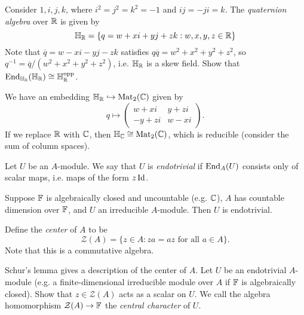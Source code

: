 \begin{exercise}
  Consider $1, i, j, k$, where
  $i^2 = j^2 = k^2 = -1$ and
  $ij = -ji = k$. The
  \emph{quaternion algebra} over $\mathbb{R}$ is
  given by
  \[
    \mathbb{H}_{\mathbb{R}}
    = \{q = w + xi + yj + zk : w, x, y, z \in \mathbb{R}\}
  \]
  Note that $\overline{q} = w - xi - yj - zk$
  satisfies
  $q \overline{q} = w^2 + x^2 + y^2 + z^2$,
  so $q^{-1} = \overline{q} / (w^2 + x^2 + y^2 + z^2)$, i.e.
  $\mathbb{H}_{\mathbb{R}}$ is a skew field.
  Show that
  $\operatorname{End}_{\mathbb{H}_{\mathbb{R}}}(\mathbb{H}_{\mathbb{R}}) \cong \mathbb{H}_{\mathbb{R}}^\mathrm{opp}$.
\end{exercise}

\begin{remark}
  We have an embedding
  $\mathbb{H}_{\mathbb{R}} \hookrightarrow \operatorname{Mat}_2(\mathbb{C})$
  given by
  \[
    q \longmapsto
    \begin{pmatrix}
      w + xi & y + zi \\
      -y + zi & w - xi
    \end{pmatrix}.
  \]
  If we replace $\mathbb{R}$ with $\mathbb{C}$, then
  $\mathbb{H}_{\mathbb{C}} \cong \operatorname{Mat}_2(\mathbb{C})$,
  which is reducible (consider the sum of
  column spaces).
\end{remark}

\begin{definition}
  Let $U$ be an $A$-module. We say that
  $U$ is \emph{endotrivial} if
  $\operatorname{End}_A(U)$ consists only of scalar maps,
  i.e. maps of the form $z \operatorname{Id}$.
\end{definition}

\begin{remark}
  Suppose $\mathbb{F}$ is algebraically closed and
  uncountable (e.g. $\mathbb{C}$), $A$ has
  countable dimension over $\mathbb{F}$, and
  $U$ an irreducible $A$-module. Then
  $U$ is endotrivial.
\end{remark}

\begin{definition}
  Define the \emph{center} of $A$ to be
  \[
    \mathcal{Z}(A) = \{z \in A : za = az \text{ for all } a \in A\}.
  \]
  Note that this is a commutative algebra.
\end{definition}

\begin{exercise}
  Schur's lemma gives a description of
  the center of $A$.
  Let $U$ be an endotrivial $A$-module
  (e.g. a finite-dimensional irreducible
  module over
  $A$ if $\mathbb{F}$ is algebraically closed).
  Show that $z \in \mathcal{Z}(A)$ 
  acts as a scalar on $U$. We call the
  algebra homomorphism
  $\mathcal{Z}(A) \to \mathbb{F}$ the
  \emph{central character} of $U$.
\end{exercise}

